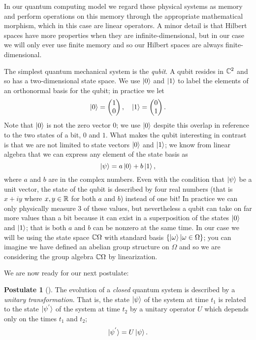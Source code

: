 \documentclass[12pt,twoside]{reedthesis}
\theoremstyle{plain}   %
\theoremstyle{definition}
\newtheorem{post}{Postulate}[section]
\theoremstyle{remark}
\numberwithin{equation}{section}
\begin{document}
  In our quantum computing model we regard these physical systems as memory and perform operations on this memory through the appropriate mathematical morphism, which in this case are linear operators.
  A minor detail is that Hilbert spaces have more properties when they are infinite-dimensional, but in our case we will only ever use finite memory and so our Hilbert spaces are always finite-dimensional. \par
  The simplest quantum mechanical system is the \emph{qubit}. A qubit resides in $\mathbb{C}^2$ and so has a two-dimensional state space.
  We use $\ket{0}$ and $\ket{1}$ to label the elements of an orthonormal basis for the qubit; in practice we let
  \[\ket{0} =
    \begin{pmatrix}
      1 \\
      0
    \end{pmatrix},
    \quad
    \ket{1} =
    \begin{pmatrix}
      0 \\
      1
    \end{pmatrix}.
  \]
  Note that $\ket{0}$ is not the zero vector $0$; we use $\ket{0}$ despite this overlap in reference to the two states of a bit, $0$ and $1$.
  What makes the qubit interesting in contrast is that we are not limited to state vectors $\ket{0}$ and $\ket{1}$; we know from linear algebra that
  we can express any element of the state basis as
  \[\ket{\psi} = a \ket{0} + b \ket{1}, \]
  where $a$ and $b$ are in the complex numbers. Even with the condition that $\ket{\psi}$ be a unit vector,
  the state of the qubit is described by four real numbers (that is $x +iy$ where $x,y \in \mathbb{R}$ for both $a$ and $b$) instead of one bit! In practice we can only physically measure $3$ of these values,
  but nevertheless a qubit can take on far more values than a bit because it can exist in a superposition of the states $\ket{0}$ and $\ket{1}$; that is both $a$ and $b$ can be nonzero at the same time.
  In our case we will be using the state space $\mathbb{C} \Omega$ with standard basis $\{ \ket{\omega} | \omega \in \Omega\}$; you can imagine we have defined an abelian group structure on $\Omega$ and so we are
  considering the group algebra $\mathbb{C} \Omega$ by linearization. \par
  We are now ready for our next postulate:
  \begin{post}[{\cite[2.2.2]{nielsen2010}}]
    The evolution of a \emph{closed} quantum system is described by a \emph{unitary transformation}. That is, the state $\ket{\psi}$ of the system at time $t_1$ is related to the state
    $\ket{ \psi^{'} }$ of the system at time $t_2$ by a unitary operator $U$ which depends only on the times $t_1$ and $t_2$;
    \[ \ket{\psi^{'}} = U \ket{\psi}.\]
  \end{post}
\end{document}
